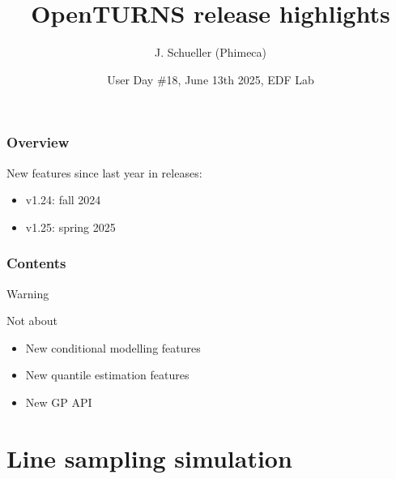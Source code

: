 \documentclass[aspectratio=169]{beamer}
\title[OpenTURNS]{OpenTURNS release highlights}
\author[OpenTURNS et al.]{J. Schueller (Phimeca)}
\date[]{User Day \#18, June 13th 2025, EDF Lab}
\begin{document}

  \begin{frame}
  \titlepage
  \end{frame}

\begin{frame}
\frametitle{Overview}

New features since last year in releases:

\begin{itemize}
\item v1.24: fall 2024
\item v1.25: spring 2025
\end{itemize}

\end{frame}
  

\begin{frame}
\frametitle{Contents}
\tableofcontents
\end{frame}


\begin{frame}{Warning}

\begin{block}{Not about}

\begin{itemize}
\item New conditional modelling features
\item New quantile estimation features
\item New GP API
\end{itemize}

\end{block}

\end{frame}


\section{Line sampling simulation}
\end{document}
